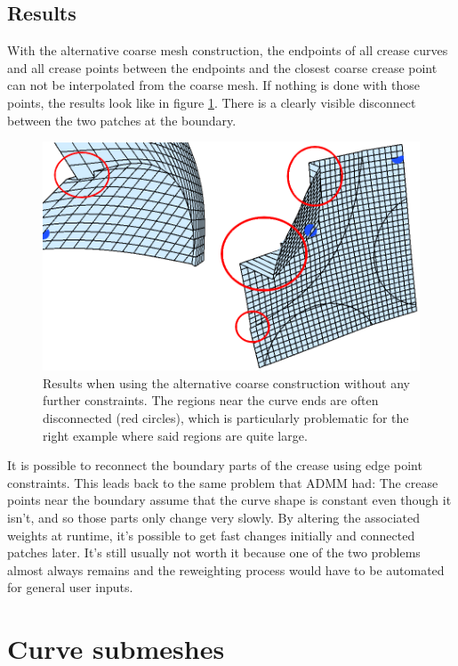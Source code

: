 \documentclass[a4paper,twoside,12pt,nochapterprefix]{scrbook}
\begin{document}
\subsection{Results}
With the alternative coarse mesh construction, the endpoints of all crease curves and all crease points between the endpoints and the closest coarse crease point can not be interpolated from the coarse mesh. If nothing is done with those points, the results look like in figure \ref{fig:alt_coarse_result}. There is a clearly visible disconnect between the two patches at the boundary.\newline
\begin{figure}
    \centering
    \includegraphics{figures/0321_dislocated}
    \caption{Results when using the alternative coarse construction without any further constraints. The regions near the curve ends are often disconnected (red circles), which is particularly problematic for the right example where said regions are quite large.}
      \label{fig:alt_coarse_result}
\end{figure}
It is possible to reconnect the boundary parts of the crease using edge point constraints. This leads back to the same problem that ADMM had: The crease points near the boundary assume that the curve shape is constant even though it isn't, and so those parts only change very slowly. By altering the associated weights at runtime, it's possible to get fast changes initially and connected patches later. It's still usually not worth it because one of the two problems almost always remains and the reweighting process would have to be automated for general user inputs.\newline


\section{Curve submeshes}\label{sec:curve_submeshes}
\end{document}

